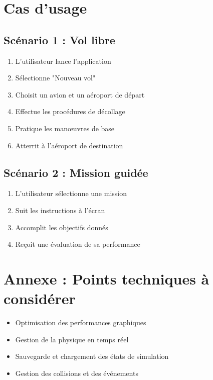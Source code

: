 \documentclass[12pt,a4paper]{article}
\begin{document}
\section{Cas d'usage}
\subsection{Scénario 1 : Vol libre}
\begin{enumerate}
    \item L'utilisateur lance l'application
    \item Sélectionne "Nouveau vol"
    \item Choisit un avion et un aéroport de départ
    \item Effectue les procédures de décollage
    \item Pratique les manœuvres de base
    \item Atterrit à l'aéroport de destination
\end{enumerate}

\subsection{Scénario 2 : Mission guidée}
\begin{enumerate}
    \item L'utilisateur sélectionne une mission
    \item Suit les instructions à l'écran
    \item Accomplit les objectifs donnés
    \item Reçoit une évaluation de sa performance
\end{enumerate}

\section{Annexe : Points techniques à considérer}
\begin{itemize}
    \item Optimisation des performances graphiques
    \item Gestion de la physique en temps réel
    \item Sauvegarde et chargement des états de simulation
    \item Gestion des collisions et des événements
\end{itemize}
\end{document}
